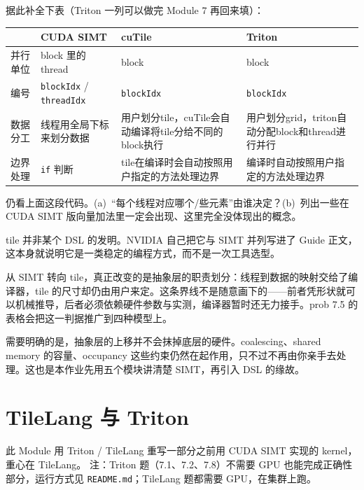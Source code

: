 \documentclass[11pt,a4paper,fontset=none]{ctexart}
\begin{document}
据此补全下表（Triton 一列可以做完 Module 7 再回来填）：

\begin{center}\small
\begin{tabular}{@{}lp{8em}p{9em}p{9em}@{}}
\toprule
 & CUDA SIMT & cuTile & Triton \\
\midrule
并行单位 & block 里的 thread & block & block\\
编号 & \texttt{blockIdx} / \texttt{threadIdx} & \texttt{blockIdx} & \texttt{blockIdx}\\
数据分工 & 线程用全局下标来划分数据 & 用户划分tile，cuTile会自动编译将tile分给不同的block执行 & 用户划分grid，triton自动分配block和thread进行并行\\
边界处理 & \texttt{if} 判断 & tile在编译时会自动按照用户指定的方法处理边界 & 编译时自动按照用户指定的方法处理边界\\
\bottomrule
\end{tabular}
\end{center}

仍看上面这段代码。(a)~“每个线程对应哪个/些元素”由谁决定？(b)~列出一些在 CUDA SIMT 版向量加法里一定会出现、这里完全没体现出的概念。

\begin{lookback}
tile 并非某个 DSL 的发明。NVIDIA 自己把它与 SIMT 并列写进了 Guide 正文，这本身就说明它是一类稳定的编程方式，而不是一次工具选型。

从 SIMT 转向 tile，真正改变的是抽象层的职责划分：线程到数据的映射交给了编译器，tile 的尺寸却仍由用户来定。这条界线不是随意画下的——前者凭形状就可以机械推导，后者必须依赖硬件参数与实测，编译器暂时还无力接手。prob 7.5 的表格会把这一判据推广到四种模型上。

需要明确的是，抽象层的上移并不会抹掉底层的硬件。coalescing、shared memory 的容量、occupancy 这些约束仍然在起作用，只不过不再由你亲手去处理。这也是本作业先用五个模块讲清楚 SIMT，再引入 DSL 的缘故。
\end{lookback}

\section{TileLang 与 Triton}

此 Module 用 Triton / TileLang 重写一部分之前用 CUDA SIMT 实现的 kernel，重心在 TileLang。
注：Triton 题（7.1、7.2、7.8）不需要 GPU 也能完成正确性部分，运行方式见 \texttt{README.md}；TileLang 题都需要 GPU，在集群上跑。
\end{document}
